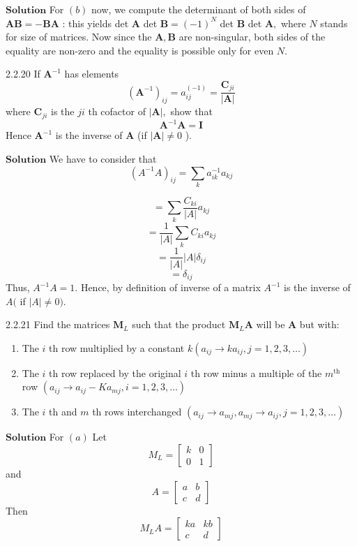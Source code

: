\documentclass{article}
\begin{document}
\begin{flushleft}
$\boxed{\textbf{Solution}}$ For $(b)$ now, we compute the determinant of both sides of $\mathbf{A} \mathbf{B}=-\mathbf{B} \mathbf{A}$ : this yields det $\mathbf{A}$ det $\mathbf{B}=(-1)^{N}$ det $\mathbf{B}$ det $\mathbf{A},$ where $N$ stands for size of matrices. Now since the $\mathbf{A}, \mathbf{B}$ are non-singular, both sides of the equality are non-zero and the equality is possible only for even $N .$


\newpage


\begin{mybox}{2.2.20}
If $\mathbf{A}^{-1}$ has elements
$$
\left(\mathbf{A}^{-1}\right)_{i j}=a_{i j}^{(-1)}=\frac{\mathbf{C}_{j i}}{|\mathbf{A}|}
$$
where $\mathbf{C}_{j i}$ is the $j i$ th cofactor of $|\mathbf{A}|,$ show that
$$
\mathbf{A}^{-1} \mathbf{A}=\mathbf{I}
$$
Hence $\mathbf{A}^{-1}$ is the inverse of $\mathbf{A}$ (if $|\mathbf{A}| \neq 0$ ).
\end{mybox}

$\boxed{\textbf{Solution}}$ We have to consider that
$$
\left(A^{-1} A\right)_{i j}=\sum_{k} a_{i k}^{-1} a_{k j}
$$

$$=\sum_{k} \frac{C_{k i}}{|A|} a_{k j}$$
$$=\frac{1}{|A|} \sum_{k} C_{k i} a_{k j}$$
$$=\frac{1}{|A|}|A| \delta_{i j}$$
$$=\delta_{i j}$$
Thus, $A^{-1} A=1$. Hence, by definition of inverse of a matrix $A^{-1}$ is the inverse of $A($ if $|A| \neq 0)$. 






\newpage



\begin{mybox}{2.2.21}
Find the matrices $\mathbf{M}_{L}$ such that the product $\mathbf{M}_{L} \mathbf{A}$ will be $\mathbf{A}$ but with:
\begin{enumerate}[$(a)$]
\item The $i$ th row multiplied by a constant $k\left(a_{i j} \rightarrow k a_{i j}, j=1,2,3, \ldots\right)$
\item The $i$ th row replaced by the original $i$ th row minus a multiple of the $m^{\text{th}}$ row
$\left(a_{i j} \rightarrow a_{i j}-K a_{m j}, i=1,2,3, \ldots\right)$
\item The $i$ th and $m$ th rows interchanged $\left(a_{i j} \rightarrow a_{m j}, a_{m j} \rightarrow a_{i j}, j=1,2,3, \ldots\right)$

\end{enumerate}
\end{mybox}

$\boxed{\textbf{Solution}}$  For $(a)$ Let 
$$M_{L}=\left[\begin{array}{ll}k & 0 \\ 0 & 1\end{array}\right]$$ 
and 
$$A=\left[\begin{array}{ll}a & b \\ c & d\end{array}\right]$$
Then 
$$M_{L} A=\left[\begin{array}{cc}k a & k b \\ c & d\end{array}\right]$$


\end{flushleft}
\end{document}
